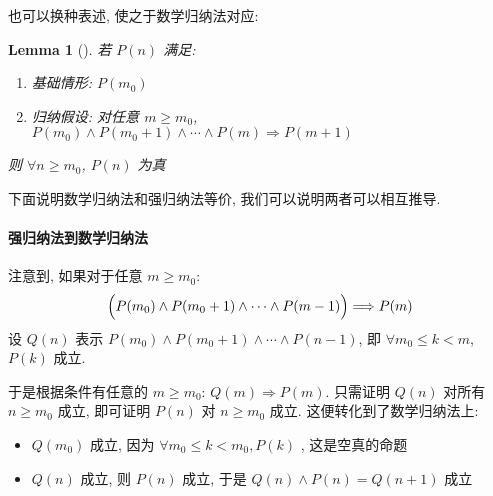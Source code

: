 \documentclass[UTF8]{ctexart}
\newtheorem{lemma}{Lemma}
\begin{document}
也可以换种表述, 使之于数学归纳法对应:
\begin{lemma}[]
    若 $ P(n) $ 满足:
    \begin{enumerate}
        \item 基础情形: $ P(m_0) $
        \item 归纳假设: 对任意 $ m \geqslant m_0 $, $ P(m_0) \land P(m_0 + 1) \land \cdots \land P(m) \Longrightarrow P(m + 1) $
    \end{enumerate}
    则 $ \forall n \geqslant m_0 $, $ P(n) $ 为真
\end{lemma}

下面说明数学归纳法和强归纳法等价, 我们可以说明两者可以相互推导.
\paragraph{强归纳法到数学归纳法}
注意到, 如果对于任意 $ m \geqslant m_0 $: \[ \Bigl( P(m_0) \land P(m_0 + 1) \land \cdots \land P(m - 1) \Bigr) \Longrightarrow P(m) \] 设 $ Q(n) $ 表示 $ P(m_0) \land P(m_0 + 1) \land \cdots \land P(n - 1) $, 即 $ \forall m_0 \leqslant k < m $, $ P(k) $ 成立. 

于是根据条件有任意的 $ m \geqslant m_0 $: $ Q(m) \Longrightarrow P(m) $. 只需证明 $ Q(n) $ 对所有 $ n \geqslant m_0 $ 成立, 即可证明 $ P(n) $ 对 $ n \geqslant m_0 $ 成立. 这便转化到了数学归纳法上:
\begin{itemize}
    \item $ Q(m_0) $ 成立, 因为 $ \forall m_0 \leqslant k < m_0, P(k) $ , 这是空真的命题
    \item $ Q(n) $ 成立, 则 $ P(n) $ 成立, 于是 $ Q(n) \land P(n) = Q(n + 1) $ 成立
\end{itemize}
\end{document}
